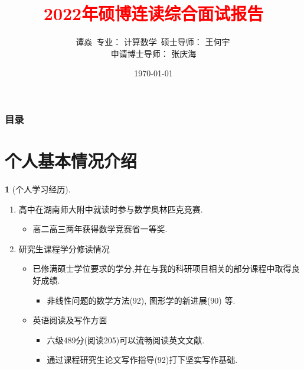 \documentclass[UTF8]{ctexbeamer}	%
\title{\textcolor{red}{2022年硕博连读综合面试报告}}
\author{谭焱\, \newline   \newline \small{专业： 计算数学}\, 
\newline \newline
 \small{硕士导师： 王何宇\, \\
 申请博士导师： 张庆海}}
\institute{浙江大学数学科学学院}
\date{\today}
\theoremstyle{plain}
\theoremstyle{definition}
\newtheorem{emt}{}[section]
\theoremstyle{remark}
\numberwithin{equation}{section}
\begin{document}

\begin{frame}
\titlepage
\end{frame}


\begin{frame}
    \frametitle{目录}
    \tableofcontents
  \end{frame}

\section{个人基本情况介绍}


        


\begin{frame}[fragile]
    \begin{emt}[个人学习经历]
\begin{enumerate}
    \item 高中在湖南师大附中就读时参与数学奥林匹克竞赛.
    \begin{itemize}
        \item 高二高三两年获得数学竞赛省一等奖.
    \end{itemize}
    \item 研究生课程学分修读情况
    \begin{itemize}
        \item 已修满硕士学位要求的学分,并在与我的科研项目相关的部分课程中取得良好成绩.
        \begin{itemize}
            \item 非线性问题的数学方法(92), 图形学的新进展(90) 等.
        \end{itemize}
        \item 英语阅读及写作方面
        \begin{itemize}
            \item 六级489分(阅读205)可以流畅阅读英文文献.
            \item 通过课程研究生论文写作指导(92)打下坚实写作基础.
        \end{itemize}
    \end{itemize}
\end{enumerate}
\end{emt}
\end{frame}
\end{document}
